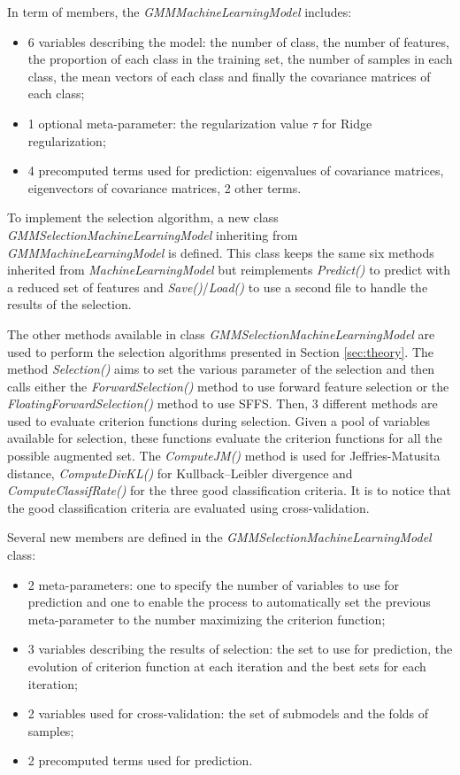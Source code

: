 \documentclass[a4paper,11pt,DIV=16]{scrartcl}
\begin{document}
        In term of members, the \emph{GMMMachineLearningModel} includes:
        \begin{itemize}
            \item 6 variables describing the model: the number of class, the number of features, the proportion of each class in the training set, the number of samples in each class, the mean vectors of each class and finally the covariance matrices of each class;
            \item 1 optional meta-parameter: the regularization value $\tau$ for Ridge regularization;
            \item 4 precomputed terms used for prediction: eigenvalues of covariance matrices, eigenvectors of covariance matrices, 2 other terms.
        \end{itemize}

        To implement the selection algorithm, a new class \emph{GMMSelectionMachineLearningModel} inheriting from \emph{GMMMachineLearningModel} is defined. This class keeps the same six methods inherited from \emph{MachineLearningModel} but reimplements \emph{Predict()} to predict with a reduced set of features and  \emph{Save()}/\emph{Load()} to use a second file to handle the results of the selection.

        The other methods available in class \emph{GMMSelectionMachineLearningModel} are used to perform the selection algorithms presented in Section \ref{sec:theory}. The method \emph{Selection()} aims to set the various parameter of the selection and then calls either the \emph{ForwardSelection()} method to use forward feature selection or the \emph{FloatingForwardSelection()} method to use SFFS. Then, 3 different methods are used to evaluate criterion functions during selection. Given a pool of variables available for selection, these functions evaluate the criterion functions for all the possible augmented set. The \emph{ComputeJM()} method is used for Jeffries-Matusita distance, \emph{ComputeDivKL()} for Kullback–Leibler divergence and \emph{ComputeClassifRate()} for the three good classification criteria. It is to notice that the good classification criteria are evaluated using cross-validation.

        Several new members are defined in the \emph{GMMSelectionMachineLearningModel} class:
        \begin{itemize}
            \item 2 meta-parameters: one to specify the number of variables to use for prediction and one to enable the process to automatically set the previous meta-parameter to the number maximizing the criterion function;
            \item 3 variables describing the results of selection: the set to use for prediction, the evolution of criterion function at each iteration and the best sets for each iteration;
            \item 2 variables used for cross-validation: the set of submodels and the folds of samples;
            \item 2 precomputed terms used for prediction.
        \end{itemize}
\end{document}

